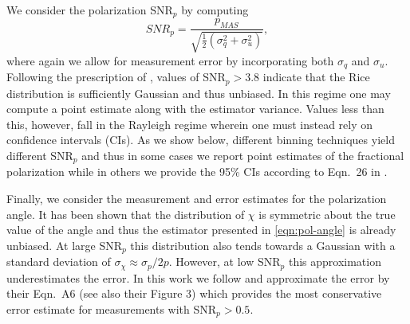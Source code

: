 We consider the polarization SNR$_p$ by computing 
\begin{equation}\label{eqn: snr}
SNR_p = \frac{p_{MAS}}{\sqrt{\frac{1}{2}(\sigma_q^2 + \sigma_u^2)}},
\end{equation}
where again we allow for measurement error by incorporating both $\sigma_q$ and $\sigma_u$.
Following the prescription of \cite{Plaszczynski2014}, values of SNR$_p > 3.8$ indicate that the Rice distribution is sufficiently Gaussian and thus unbiased. In this regime one may compute a point estimate along with the estimator variance. Values less than this, however, fall in the Rayleigh regime wherein one must instead rely on confidence intervals (CIs).  As we show below, different binning techniques yield different SNR$_p$ and thus in some cases we report point estimates of the fractional polarization while in others we provide the 95\% CIs according to Eqn.~26 in \cite{Plaszczynski2014}.

Finally, we consider the measurement and error estimates for the polarization angle. It has been shown \cite[e.g.][]{WardleKronberg1974, Vinokur1965} that the distribution of $\chi$ is symmetric about the true value of the angle and thus the estimator presented in \autoref{eqn:pol-angle} is already unbiased. At large SNR$_p$ this distribution also tends towards a Gaussian with a standard deviation of  $\sigma_{\chi} \approx \sigma_p/2p$. However, at low SNR$_p$ this approximation underestimates the error. In this work we follow \cite{WardleKronberg1974} and approximate the error by their Eqn.~A6 (see also their Figure 3) which provides the most conservative error estimate for measurements with SNR$_p > 0.5$.

